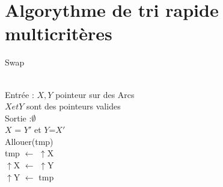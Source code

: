 \documentclass[UTF8]{EPURapport}
\begin{document}



\chapter{Algorythme de tri rapide multicritères}

\begin{algorithm}
\caption{Swap}
\label{Swap}
\begin{algorithmic}[1]
\REQUIRE  ~\\
Entrée : $X,Y$  pointeur sur des Arcs\\
$X et Y$  sont des pointeurs valides
\ENSURE ~\\
Sortie :$\emptyset$ \\
$X$ = $Y'$ et $Y$=$X'$\\
 \STATE Allouer(tmp)\\
 \STATE tmp $\gets$ $\uparrow$X\\
 \STATE $\uparrow$X $\gets$ $\uparrow$Y\\
 \STATE $\uparrow$Y $\gets$ tmp
\end{algorithmic}
\end{algorithm}
\end{document}
